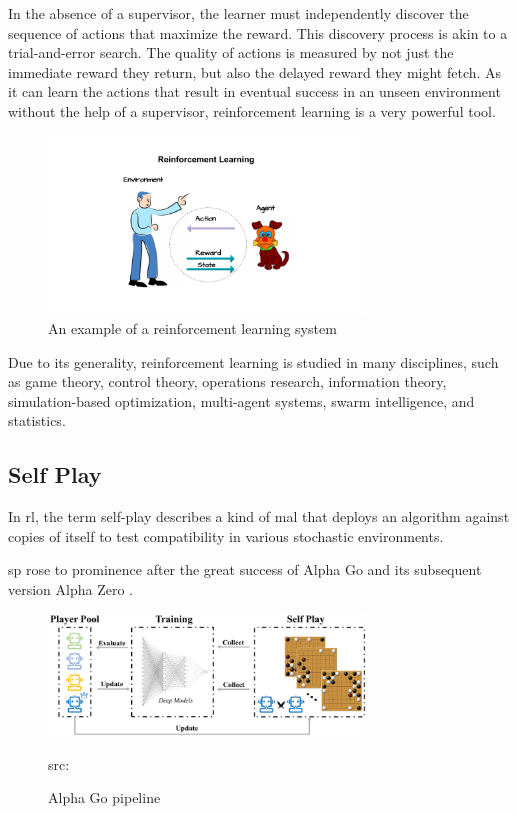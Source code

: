 In the absence of a supervisor, the learner must independently discover the sequence of actions that maximize the reward. This discovery process is akin to a trial-and-error search. The quality of actions is measured by not just the immediate reward they return, but also the delayed reward they might fetch. As it can learn the actions that result in eventual success in an unseen environment without the help of a supervisor, reinforcement learning is a very powerful tool.
\begin{figure}[H]
	\centering
	\includegraphics[width=0.75\textwidth]{Figures/RLCartoon.png}
	\caption{An example of a reinforcement learning system}
\end{figure}
\FloatBarrier


Due to its generality, reinforcement learning is studied in many disciplines, such as game theory, control theory, operations research, information theory, simulation-based optimization, multi-agent systems, swarm intelligence, and statistics. 
\subsection{Self Play}
In \acrfull{rl}, the term self-play describes a kind of \acrfull{mal} that
deploys an algorithm against copies of itself to test compatibility in various stochastic environments.

\acrfull{sp} rose to prominence after the great success of Alpha Go \cite{AlphaGo} and its subsequent version Alpha Zero \cite{AlphaZero}.

\begin{figure}[H]
	\centering
	\includegraphics[width=0.75\textwidth]{Figures/AlphaZeroSelfPlay.png}
	\caption{Alpha Go pipeline}
	\scriptsize src: 
\end{figure}
\FloatBarrier
